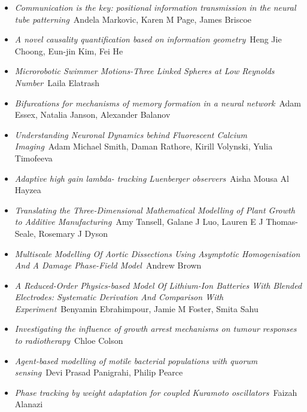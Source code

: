 \begin{itemize}
\item \textit{Communication is the key: positional information transmission in the neural tube patterning}\
Andela Markovic, Karen M Page, James Briscoe

\item \textit{A novel causality quantification based on information geometry}\
Heng Jie Choong, Eun-jin Kim, Fei He

\item \textit{Microrobotic Swimmer Motions-Three Linked Spheres at Low Reynolds Number}\
Laila Elatrash

\item \textit{Bifurcations for mechanisms of memory formation in a neural network}\
Adam Essex, Natalia Janson, Alexander Balanov

\item \textit{Understanding Neuronal Dynamics behind Fluorescent Calcium Imaging}\
Adam Michael Smith, Daman Rathore, Kirill Volynski, Yulia Timofeeva

\item \textit{Adaptive high gain lambda- tracking Luenberger observers}\
Aisha Mousa Al Hayzea

\item \textit{Translating the Three-Dimensional Mathematical Modelling of Plant Growth to Additive Manufacturing}\
Amy Tansell, Galane J Luo, Lauren E J Thomas-Seale, Rosemary J Dyson

\item \textit{Multiscale Modelling Of Aortic Dissections Using Asymptotic Homogenisation And A Damage Phase-Field Model}\
Andrew Brown

\item \textit{A Reduced-Order Physics-based Model Of Lithium-Ion Batteries With Blended Electrodes: Systematic Derivation And Comparison With Experiment}\
Benyamin Ebrahimpour, Jamie M Foster, Smita Sahu

\item \textit{Investigating the influence of growth arrest mechanisms on tumour responses to radiotherapy}\
Chloe Colson

\item \textit{Agent-based modelling of motile bacterial populations with quorum sensing}\
Devi Prasad Panigrahi, Philip Pearce

\item \textit{Phase tracking by weight adaptation for coupled Kuramoto oscillators}\
Faizah Alanazi


\end{itemize}
